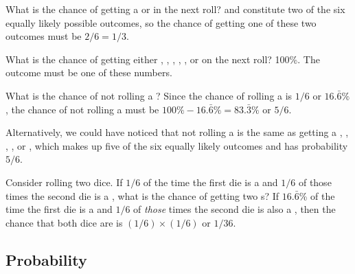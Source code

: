 \begin{examplewrap}
\begin{nexample}{What is the chance of getting a  or  in the next roll?}\label{probOf1Or2}
 and  constitute two of the six equally likely possible outcomes, so the chance of getting one of these two outcomes must be $2/6 = 1/3$.
\end{nexample}
\end{examplewrap}

\begin{examplewrap}
\begin{nexample}{What is the chance of getting either , , , , , or  on the next roll?}\label{probOf123456}
100\%. The outcome must be one of these numbers.
\end{nexample}
\end{examplewrap}

\begin{examplewrap}
\begin{nexample}{What is the chance of not rolling a ?}\label{probNot2}
Since the chance of rolling a  is $1/6$ or $16.\bar{6}\%$, the chance of not rolling a  must be $100\% - 16.\bar{6}\%=83.\bar{3}\%$ or $5/6$.

Alternatively, we could have noticed that not rolling a  is the same as getting a , , , , or , which makes up five of the six equally likely outcomes and has probability $5/6$.
\end{nexample}
\end{examplewrap}

\begin{examplewrap}
\begin{nexample}{Consider rolling two dice. If $1/6$ of the time the first die is a  and $1/6$ of those times the second die is a , what is the chance of getting two s?}\label{probOf2Ones}
If $16.\bar{6}$\% of the time the first die is a  and $1/6$ of \emph{those} times the second die is also a , then the chance that both dice are  is $(1/6)\times (1/6)$ or $1/36$.
\end{nexample}
\end{examplewrap}


\D{\newpage}

\subsection{Probability}


